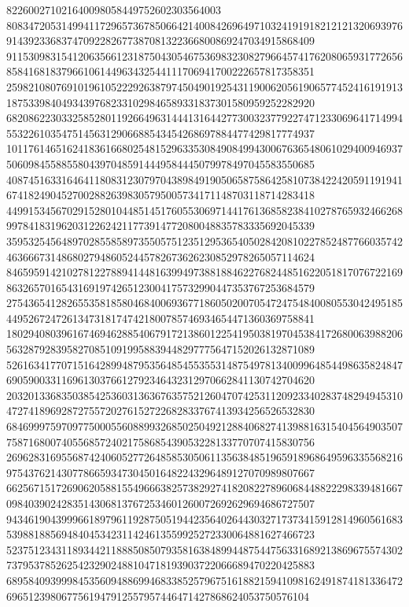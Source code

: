 \documentclass[10pt,
b5paper,
fleqn,
dvipdfmx,
uplatex
]{jsarticle}
\begin{document}
822600271021640098058449752602303564003\\80834720531499411729657367850664214008426964971032419191821212132069397691439233683747092282677387081322366800869247034915868409\\91153098315412063566123187504305467536983230827966457417620806593177265685841681837966106144963432544111706941700222657817358351\\25982108076910196105222926387974504901925431190062056190657745241619191318753398404934397682331029846589331837301580959252282920\\68208622303325852801192664963144413164427730032377922747123306964171499455322610354751456312906688543454268697884477429817774937\\10117614651624183616680254815296335308490849943006763654806102940094693750609845588558043970485914449584445079978497045583550685\\40874516331646411808312307970438984919050658758642581073842242059119194167418249045270028826398305795005734171148703118714283418\\44991534567029152801044851451760553069714417613685823841027876593246626899784183196203122624211773914772080048835783335692045339\\35953254564897028558589735505751235129536540502842081022785248776603574246366673148680279486052445782673626230852978265057114624\\84659591421027812278894144816399497388188462276824485162205181707672216986326570165431691974265123004175732990447353767253684579\\27543654128265535818580468400693677186050200705472475484008055304249518544952672472613473181747421800785746934654471360369758841\\18029408039616746946288540679172138601225419503819704538417268006398820656328792839582708510919958839448297775647152026132871089\\52616341770715164289948795356485455355314875497813400996485449863582484769059003311696130376612792346432312970662841130742704620\\20320133683503854253603136367635752126047074253112092334028374829494531047274189692872755720276152722682833767413934256526532830\\68469997597097750005560889932685025049212884068274139881631540456490350775871680074055685724021758685439053228133770707415830756\\26962831695568742406052772648585305061135638485196591896864959633556821697543762143077866593473045016482243296489127070989807667\\66256715172690620588155496663825738292741820822789606844882229833948166709840390242835143068137672534601260072692629694686727507\\94346190439996618979611928750519442356402644303271737341591281496056168353988188569484045342311424613559925272330064881627466723\\52375123431189344211888508507935816384899448754475633168921386967557430273795378526254232902488104718193903722066689470220425883\\6895840939998453560948869946833852579675161882159410981624918741813364726965123980677561947912557957446471427868624053750576104
\end{document}
